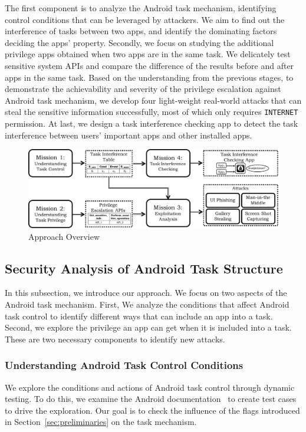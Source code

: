\documentclass[letterpaper,12pt]{article}
\begin{document}
The first component is to analyze the Android task mechanism,
identifying control conditions that can be leveraged by attackers.
We aim to find out the interference of tasks between two
apps, and identify the dominating factors deciding the apps'
property.  Secondly, we focus on studying the additional privilege
apps obtained when two apps are in the same task. We delicately test sensitive
system APIs and compare the difference of the results before and after
apps in the same task. Based on the understanding from the previous
stages, to demonstrate the achievability and severity of the
privilege escalation against Android task mechanism, we develop four light-weight
real-world attacks that can steal the sensitive information
successfully, most of which only requires \texttt{INTERNET}
permission.  At last, we design a task interference checking app to
detect the task interference between users' important apps and other
installed apps.

\begin{figure}[t]
        \centering
        \includegraphics[width=1\linewidth]{overall.pdf}
        \caption{Approach Overview}
        \label{fig:arch}
\end{figure}
\subsection{Security Analysis of Android Task Structure}\label{sec:atmapproach}
In this subsection, we introduce our approach. We focus on two aspects of
the Android task mechanism. First, We analyze the conditions that
affect Android task control to identify different ways that can
include an app into a task. Second, we explore the privilege an app
can get when it is included into a task. These are two necessary
components to identify new attacks.


\subsubsection{Understanding Android Task Control Conditions}

We explore the conditions and actions of Android task control through
dynamic testing.  To do this, we examine the Android
documentation~\cite{taskdoc} to create test cases to drive the
exploration. Our goal is to check the influence of the flags
introduced in Section~\ref{sec:preliminaries} on the task mechanism.
\end{document}
